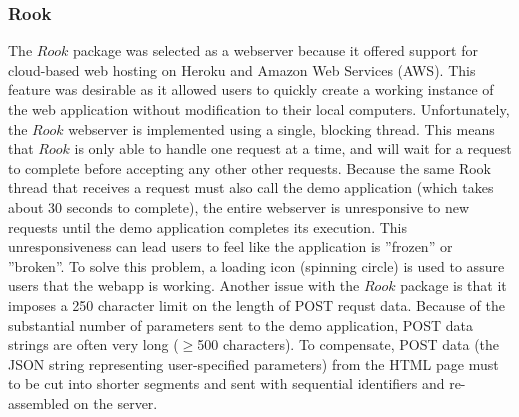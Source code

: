 \subsubsection{Rook}
The $Rook$ package was selected as a webserver because it offered support for cloud-based web hosting on Heroku and Amazon Web Services (AWS).  This feature was desirable as it allowed users to quickly create a working instance of the web application without modification to their local computers.  Unfortunately, the $Rook$ webserver is implemented using a single, blocking thread.  This means that $Rook$ is only able to handle one request at a time, and will wait for a request to complete before accepting any other other requests.  Because the same Rook thread that receives a request must also call the demo application (which takes about 30 seconds to complete), the entire webserver is unresponsive to new requests until the demo application completes its execution.  This unresponsiveness can lead users to feel like the application is ''frozen'' or ''broken''.  To solve this problem, a loading icon (spinning circle) is used to assure users that the webapp is working.  Another issue with the $Rook$ package is that it imposes a 250 character limit on the length of POST requst data.  Because of the substantial number of parameters sent to the demo application, POST data strings are often very long ($\ge$500 characters).  To compensate, POST data (the JSON string representing user-specified parameters) from the HTML page must to be cut into shorter segments and sent with sequential identifiers and re-assembled on the server.

